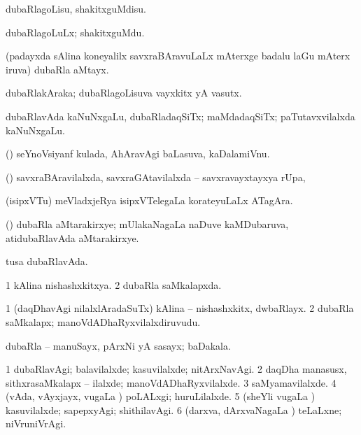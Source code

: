 \bentry
{} 
\gl{\sakirx}
\expl{}
\bmng
dubaRlagoLisu, shakitxguMdisu. 
\emng

\noindent 
\gl{\akirx}
\expl{}
\bmng
dubaRlagoLuLx; shakitxguMdu. 
\emng
\eentry

\bentry
{} 
\gl{\nA}
\bmng
(padayxda sAlina koneyalilx savxraBAravuLaLx mAterxge badalu laGu mAterx iruva) dubaRla aMtayx. 
\emng
\eentry

\bentry
{} 
\gl{\nA}
\bmng
dubaRlakAraka; dubaRlagoLisuva vayxkitx yA vasutx. 
\emng
\eentry

\bentry
{} 
\gl{\nA}
\expl{}
\bmng
dubaRlavAda kaNuNxgaLu, dubaRladaqSiTx; maMdadaqSiTx; paTutavxvilalxda kaNuNxgaLu. 
\emng
\eentry

\bentry
{} 
\gl{\nA}
\bmng
(\ame) seYnoVsiyanf kulada, AhAravAgi baLasuva, kaDalamiVnu. 
\emng
\eentry

\bentry
{}
\gl{\nA}
\bmng
(\vAyx) savxraBAravilalxda, savxraGAtavilalxda -- savxravayxtayxya rUpa, \udA\  
\emng
\eentry

\bentry
{} 
\gl{\nA}
\expl{}
\bmng
(isipxVTu) meVladxjeRya isipxVTelegaLa korateyuLaLx ATagAra. 
\emng
\eentry

\bentry
{} 
\gl{\nA}
\bmng
(\Bwvi) dubaRla aMtarakirxye; mUlakaNagaLa naDuve kaMDubaruva, atidubaRlavAda aMtarakirxye. 
\emng
\eentry

\bentry
{} 
\gl{\gu}
\expl{}
\bmng
tusa dubaRlavAda. 
\emng
\eentry

\bentry
{} 
\gl{\gu}
\expl{}
\bmng
\bnum
\num{1} kAlina nishashxkitxya. 
\num{2} dubaRla saMkalapxda. 
\enum
\emng
\eentry

\bentry
{} 
\gl{\nA}
\expl{}
\bmng
\bnum
\num{1} (daqDhavAgi nilalxlAradaSuTx) kAlina -- nishashxkitx, dwbaRlayx. 
\num{2} dubaRla saMkalapx; manoVdADhaRyxvilalxdiruvudu. 
\enum
\emng
\eentry

\bentry
{} 
\gl{\nA}
\expl{}
\bmng
dubaRla -- manuSayx, pArxNi yA sasayx; baDakala. 
\emng
\eentry

\bentry
{} 
\gl{\kirxvi}
\expl{}
\bmng
\bnum
\num{1} dubaRlavAgi; balavilalxde; kasuvilalxde; nitArxNavAgi. 
\num{2} daqDha manasusx, sithxrasaMkalapx -- ilalxde; manoVdADhaRyxvilalxde. 
\num{3} saMyamavilalxde. 
\num{4} (vAda, vAyxjayx, \mo vugaLa \vi) poLALxgi; huruLilalxde. 
\num{5} (sheYli \mo vugaLa \vi) kasuvilalxde; sapepxyAgi; shithilavAgi. 
\num{6} (darxva, dArxvaNagaLa \vi) teLaLxne; niVruniVrAgi. 
\enum
\emng
\eentry

